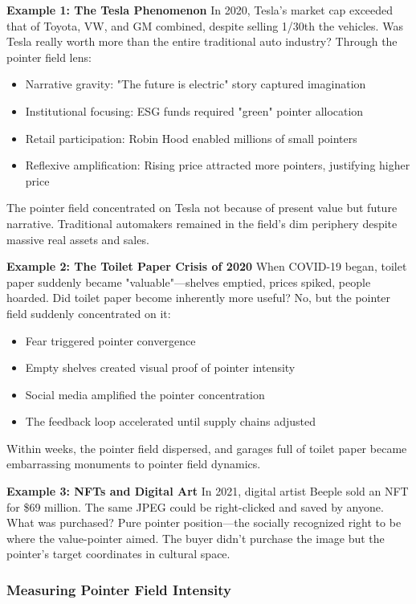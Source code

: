 \documentclass[11pt,oneside]{book}
\begin{document}
\textbf{Example 1: The Tesla Phenomenon}
In 2020, Tesla's market cap exceeded that of Toyota, VW, and GM combined, despite selling 1/30th the vehicles. Was Tesla really worth more than the entire traditional auto industry? Through the pointer field lens:
\begin{itemize}
\item Narrative gravity: "The future is electric" story captured imagination
\item Institutional focusing: ESG funds required "green" pointer allocation
\item Retail participation: Robin Hood enabled millions of small pointers
\item Reflexive amplification: Rising price attracted more pointers, justifying higher price
\end{itemize}

The pointer field concentrated on Tesla not because of present value but future narrative. Traditional automakers remained in the field's dim periphery despite massive real assets and sales.

\textbf{Example 2: The Toilet Paper Crisis of 2020}
When COVID-19 began, toilet paper suddenly became "valuable"—shelves emptied, prices spiked, people hoarded. Did toilet paper become inherently more useful? No, but the pointer field suddenly concentrated on it:
\begin{itemize}
\item Fear triggered pointer convergence
\item Empty shelves created visual proof of pointer intensity
\item Social media amplified the pointer concentration
\item The feedback loop accelerated until supply chains adjusted
\end{itemize}

Within weeks, the pointer field dispersed, and garages full of toilet paper became embarrassing monuments to pointer field dynamics.

\textbf{Example 3: NFTs and Digital Art}
In 2021, digital artist Beeple sold an NFT for \$69 million. The same JPEG could be right-clicked and saved by anyone. What was purchased? Pure pointer position—the socially recognized right to be where the value-pointer aimed. The buyer didn't purchase the image but the pointer's target coordinates in cultural space.

\subsubsection{Measuring Pointer Field Intensity}
\end{document}
